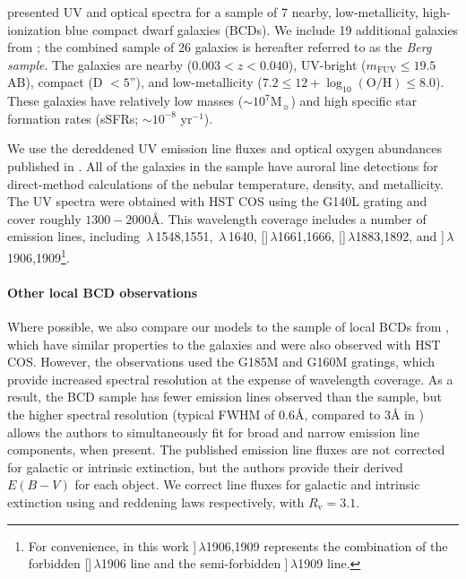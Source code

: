 \documentclass[trackchanges, preprint2]{aastex62}
\newcommand{\oiii}{[\ion{O}{3}]}
\newcommand{\heii}{\ion{He}{2}}
\newcommand{\civ}{\ion{C}{4}}
\newcommand{\SiuIII}{[\ion{Si}{3}]}
\newcommand{\ciii}{\ion{C}{3}]}
\newcommand\Msun{\ensuremath{\mathrm{M_{\sun}}}\xspace}
\newcommand{\logten}{\ensuremath{\log_{10}}}
\newcommand{\logOH}{\ensuremath{\logten (\mathrm{O}/\mathrm{H})}\xspace}
\newcommand{\ang}{\ensuremath{\mbox{\AA}}\xspace}
\begin{document}
\citet{Berg+2016} presented UV and optical spectra for a sample of 7 nearby, low-metallicity, high-ionization blue compact dwarf galaxies (BCDs). We include 19 additional galaxies from \citet{Berg+2019}; the combined sample of 26 galaxies is hereafter referred to as the \emph{Berg sample}. The galaxies are nearby ($0.003 < z < 0.040$), UV-bright ($m_{\mathrm{FUV}} \leq 19.5$ AB), compact (D $< 5$''), and low-metallicity ($7.2 \leq 12 + \logOH \leq 8.0$). These galaxies have relatively low masses (${\sim}10^7$\Msun) and high specific star formation rates (sSFRs; ${\sim}10^{-8}$ yr$^{-1}$). 

We use the dereddened UV emission line fluxes and optical oxygen abundances published in \citet{Berg+2016, Berg+2019}. All of the galaxies in the sample have auroral line detections for direct-method calculations of the nebular temperature, density, and metallicity. The UV spectra were obtained with HST COS using the G140L grating and cover roughly $1300-2000$\ang. This wavelength coverage includes a number of emission lines, including \civ$\,\lambda$\,1548,1551, \heii$\,\lambda$\,1640, \oiii$\,\lambda$1661,1666, \SiuIII$\,\lambda$1883,1892, and \ciii $\,\lambda$1906,1909\footnote{For convenience, in this work \ciii $\,\lambda$1906,1909 represents the combination of the forbidden []$\,\lambda$1906 line and the semi-forbidden ]$\,\lambda$1909 line.}.

\paragraph{Other local BCD observations} Where possible, we also compare our models to the sample of local BCDs from \citet{Senchyna+2017}, which have similar properties to the \citet{Berg+2016} galaxies and were also observed with HST COS. However, the \citet{Senchyna+2017} observations used the G185M and G160M gratings, which provide increased spectral resolution at the expense of wavelength coverage. As a result, the \citet{Senchyna+2017} BCD sample has fewer emission lines observed than the \citet{Berg+2016} sample, but the higher spectral resolution (typical FWHM of 0.6\ang, compared to 3\ang in \citealt{Berg+2016}) allows the authors to simultaneously fit for broad and narrow emission line components, when present. The published emission line fluxes are not corrected for galactic or intrinsic extinction, but the authors provide their derived $E(B-V)$ for each object. We correct line fluxes for galactic and intrinsic extinction using  \citet{Fitzpatrick+1999} and \citet{Cardelli+1989} reddening laws respectively, with $R_{\mathrm{v}} = 3.1$.
\end{document}
